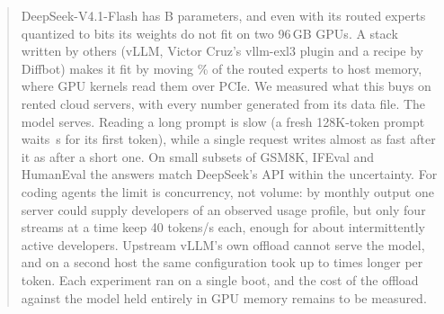\begin{abstract}
DeepSeek-V4.1-Flash has B parameters, and even with its routed experts quantized to
 bits its weights do not fit on two 96\,GB GPUs. A stack written by others (vLLM, Victor Cruz's
vllm-exl3 plugin and a recipe by Diffbot) makes it fit by moving \% of the routed
experts to host memory, where GPU kernels read them over PCIe. We measured what this buys on rented cloud servers, with
every number generated from its data file. The model serves. Reading a long prompt is slow (a fresh 128K-token prompt
waits \,s for its first token), while a single request writes almost as fast after it as
after a short one. On small subsets of GSM8K, IFEval and HumanEval the answers match DeepSeek's API within the uncertainty. For coding
agents the limit is concurrency, not volume: by monthly output one server could supply
 developers of an observed usage profile, but only four streams at a time keep
40 tokens/s each, enough for about  intermittently active developers. Upstream
vLLM's own offload cannot serve the model, and on a second host the same configuration took up to
 times longer per token. Each experiment ran
on a single boot, and the cost of the offload against the model held entirely in GPU memory remains to be measured.
\end{abstract}
